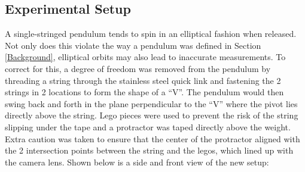 \documentclass[12pt]{article}
\begin{document}
\subsection{Experimental Setup}
{\color{blue}
A single-stringed pendulum tends to spin in an elliptical fashion when released. Not only does this violate the way a pendulum was defined in Section \ref{Background}, elliptical orbits may also lead to inaccurate measurements. To correct for this,} a degree of freedom was removed from the pendulum by threading a string through the stainless steel quick link and fastening the 2 strings in 2 locations to form the shape of a ``V''. The pendulum would then swing back and forth in the plane perpendicular to the ``V'' {\color{blue} where the pivot lies directly above the string. Lego pieces were used to prevent the risk of the string slipping under the tape and a protractor was taped directly above the weight. Extra caution was taken to ensure that the center of the protractor aligned with the 2 intersection points between the string and the legos, which lined up with the camera lens. Shown below is a side and front view of the new setup:}
\end{document}
